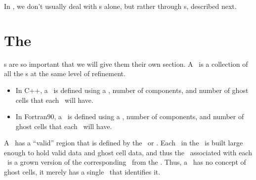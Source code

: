 In \BoxLib, we don't usually deal with 
\Fab s alone, but rather through \MultiFab s, described next.

\section{The \MultiFab}
\MultiFab s are so important that we will give them their own section.
A \MultiFab\ is a collection of all the \Fab s at the same level of
refinement.
\begin{itemize}
\item In C++, a \MultiFab\ is defined using a \BoxArray,
number of components, and number of ghost cells that each \Fab\
will have.
\item In Fortran90, a \MultiFab\ is defined using a \layout,
number of components, and number of ghost cells that each \Fab\
will have.
\end{itemize}
A \MultiFab\ has a ``valid'' region that is defined by 
the \BoxArray~or \layout.  Each \Fab\ in the \MultiFab\ is built large enough 
to hold valid data and ghost cell data, and thus the \BoxType\ associated with
each \Fab\ is a grown version of the corresponding \BoxType\ from the \BoxArray.
Thus, a \Fab\ has no concept 
of ghost cells, it merely has a single \BoxType\ that identifies it.\\

